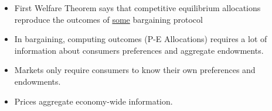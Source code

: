 \documentclass[twoside]{article}
\begin{document}
\begin{itemize}
\item First Welfare Theorem says that competitive equilibrium allocations reproduce the outcomes of \underline{some} bargaining protocol
\item In bargaining, computing outcomes (P-E Allocations) requires a lot of information about consumers preferences and aggregate endowments.
\item Markets only require consumers to know their own preferences and endowments. 
\item Prices aggregate economy-wide information. 
\end{itemize}
\end{document}
